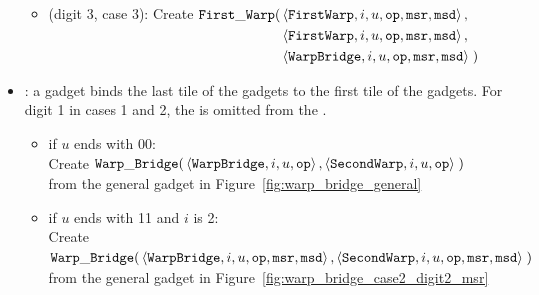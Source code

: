 \begin{itemize}
\begin{itemize}
                \item (digit 3, case 3): Create
                $\begin{aligned}[t]
                    {\tt First\_Warp}(& \left\langle {\tt FirstWarp},  i, u, {\tt op}, {\tt msr}, {\tt msd} \right\rangle, \\
                               & \left\langle {\tt FirstWarp},  i, u, {\tt op}, {\tt msr}, {\tt msd} \right\rangle, \\
                               & \left\langle {\tt WarpBridge}, i, u, {\tt op}, {\tt msr}, {\tt msd} \right\rangle \;)
                \end{aligned}$
                \vspace{.5cm}

            \end{itemize}
        \vspace{.5cm}

        \item {\warpbridge}: a {\warpbridge} gadget binds the last tile of the {\firstwarp} gadgets to the
             first tile of the {\secondwarp} gadgets. For digit 1 in cases 1 and 2, the
             {\warpbridge} is omitted from the {\warpunit}.

        \begin{itemize}

            \item if $u$ ends with 00:\\
            Create
            $\begin{aligned}[t]
                {\tt Warp\_Bridge}(& \left\langle {\tt WarpBridge}, i, u, {\tt op} \right\rangle,
                              \left\langle {\tt SecondWarp}, i, u, {\tt op} \right\rangle \;)
            \end{aligned}$ \\ from the general gadget in Figure~\ref{fig:warp_bridge_general}
            \vspace{.5cm}

            \item if $u$ ends with 11 and $i$ is 2: \\
            Create
            $\begin{aligned}[t]
                {\tt Warp\_Bridge}(& \left\langle {\tt WarpBridge}, i, u, {\tt op}, {\tt msr}, {\tt msd} \right\rangle,
                              \left\langle {\tt SecondWarp}, i, u, {\tt op}, {\tt msr}, {\tt msd} \right\rangle \;)
            \end{aligned}$ \\ from the general gadget in Figure~\ref{fig:warp_bridge_case2_digit2_msr}
            \vspace{.5cm}


\end{itemize}
\end{itemize}
